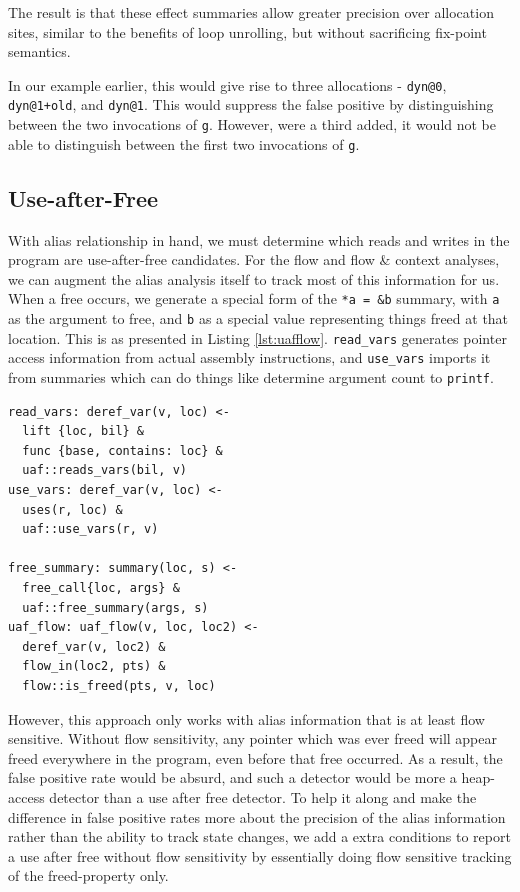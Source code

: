 The result is that these effect summaries allow greater precision over allocation sites, similar to the benefits of loop unrolling, but without sacrificing fix-point semantics.

In our example earlier, this would give rise to three allocations - \texttt{dyn@0}, \texttt{dyn@1+old}, and \texttt{dyn@1}.
This would suppress the false positive by distinguishing between the two invocations of \texttt{g}.
However, were a third added, it would not be able to distinguish between the first two invocations of \texttt{g}.

\subsection{Use-after-Free}
With alias relationship in hand, we must determine which reads and writes in the program are use-after-free candidates.
For the flow and flow \& context analyses, we can augment the alias analysis itself to track most of this information for us.
When a free occurs, we generate a special form of the \texttt{*a = \&b} summary, with \texttt{a} as the argument to free, and \texttt{b} as a special value representing things freed at that location.
This is as presented in Listing \ref{lst:uafflow}.
\texttt{read\_vars} generates pointer access information from actual assembly instructions, and \texttt{use\_vars} imports it from summaries which can do things like determine argument count to \texttt{printf}.

\begin{lstlisting}[label=lst:uafflow, caption={Tracking Frees with Flow Sensitivity}]
read_vars: deref_var(v, loc) <-
  lift {loc, bil} &
  func {base, contains: loc} &
  uaf::reads_vars(bil, v)
use_vars: deref_var(v, loc) <-
  uses(r, loc) &
  uaf::use_vars(r, v)

free_summary: summary(loc, s) <-
  free_call{loc, args} &
  uaf::free_summary(args, s)
uaf_flow: uaf_flow(v, loc, loc2) <-
  deref_var(v, loc2) &
  flow_in(loc2, pts) &
  flow::is_freed(pts, v, loc)
\end{lstlisting}

However, this approach only works with alias information that is at least flow sensitive.
Without flow sensitivity, any pointer which was ever freed will appear freed everywhere in the program, even before that free occurred.
As a result, the false positive rate would be absurd, and such a detector would be more a heap-access detector than a use after free detector.
To help it along and make the difference in false positive rates more about the precision of the alias information rather than the ability to track state changes, we add a extra conditions to report a use after free without flow sensitivity by essentially doing flow sensitive tracking of the freed-property only.

